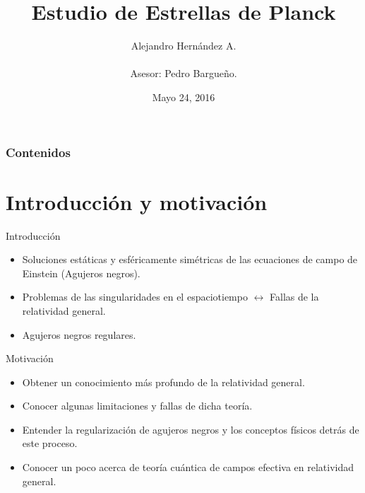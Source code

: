 \documentclass[t]{beamer}
\title[Estrellas de Planck]{Estudio de Estrellas de Planck}
\author[Alejandro Hernández A.]{Alejandro Hernández A. \\ {\ \\ \footnotesize Asesor: Pedro Bargueño.} }
\institute[Uniandes]  
{\normalsize
Universidad de los Andes, Bogotá, Colombia \\ 
}
\date{Mayo 24, 2016}
\numberwithin{equation}{section}
\begin{document}
\begin{frame}
\titlepage 
\end{frame}

\begin{frame}
\frametitle{Contenidos} 
\tableofcontents 
\end{frame}

\section{Introducción y motivación}

\begin{frame}{Introducción}
\vspace{\fill}
\begin{itemize}
\item Soluciones estáticas y esféricamente simétricas de las ecuaciones de campo de Einstein (Agujeros negros).
\vspace*{\fill}

\item Problemas de las singularidades en el espaciotiempo $\leftrightarrow$ Fallas de la relatividad general.
\vspace{\fill}

\item Agujeros negros regulares.
\end{itemize}
\end{frame}

\begin{frame}{Motivación}
\vspace{\fill}
\begin{itemize}
\item Obtener un conocimiento más profundo de la relatividad general.
\vspace*{\fill}

\item Conocer algunas limitaciones y fallas de dicha teoría.
\vspace*{\fill}

\item Entender la regularización de agujeros negros y los conceptos físicos detrás de este proceso.
\vspace*{\fill}

\item Conocer un poco acerca de teoría cuántica de campos efectiva en relatividad general.
\vspace*{\fill}

\end{itemize}
\vspace{\fill}
\end{frame}
\end{document}
